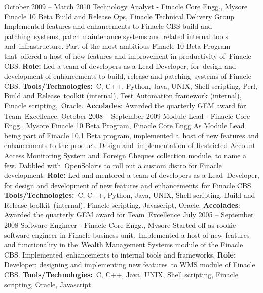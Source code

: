 \documentclass[11pt,a4paper,sans]{moderncv}
\begin{document}
\cventry
{October 2009 -- March 2010}
{Technology Analyst - Finacle Core Engg., Mysore}
{Finacle 10 Beta Build and Release Ops, Finacle Technical Delivery Group}
{}
{}
{Implemented features and enhancements to Finacle CBS build and patching\
systems, patch maintenance systems and related internal tools and\
infrastructure. Part of the most ambitious Finacle 10 Beta Program that\
offered a host of new features and improvement in productivity of\
Finacle CBS. 
\newline{}
\newline{}
\small {\textbf{Role:} Led a team of developers as a Lead Developer, for\
	design and development of enhancements to build, release and patching\
	systems of Finacle CBS.}
\newline{}
\small {\textbf{Tools/Technologies:}\
C, C++, Python, Java, UNIX, Shell scripting, Perl, Build and Release\
toolkit (internal), Test Automation framework (internal), Finacle scripting,\
Oracle.} 
\newline{}
\small {\textbf{Accolades}: Awarded the quarterly GEM award for Team\
Excellence.}
\newline{}
}
\cventry
{October 2008 -- September 2009}
{Module Lead - Finacle Core Engg., Mysore}
{Finacle 10 Beta Program, Finacle Core Engg}
{}
{}
{As Module Lead being part of Finacle 10.1 Beta program, implemented a\
host of new features and enhancements to the product. Design and\
implementation of Restricted Account Access Monitoring System and\
Foreign Cheques collection module, to name a few. Dabbled with\
OpenSolaris to roll out a custom distro for Finacle development.
\newline{}
\newline{}
\small {\textbf{Role:} Led and mentored a team of developers as a Lead\
	Developer, for design and development of new features and enhancements\
  for Finacle CBS.}
\newline{}
\small {\textbf{Tools/Technologies:}\
C, C++, Python, Java, UNIX, Shell scripting, Build and Release toolkit\
(internal), Finacle scripting, Javascript, Oracle.} 
\newline{}
\small {\textbf{Accolades}: Awarded the quarterly GEM award for Team\
Excellence}
\newline{}
}
\cventry
{July 2005 -- September 2008}
{Software Engineer - Finacle Core Engg., Mysore}
{}
{}
{}
{Started off as rookie software engineer in Finacle business unit.\
Implemented a host of new features and functionality in the\
Wealth Management Systems module of the Finacle CBS. Implemented\
enhancements to internal tools and frameworks.
\newline{} 
\newline{}
\small {\textbf{Role:} Developer; designing and implementing new features\
to WMS module of Finacle CBS.}
\newline{}
\small {\textbf{Tools/Technologies:}\
C, C++, Java, UNIX, Shell scripting, Finacle scripting, Oracle, Javascript.} 
\newline{}
}
\end{document}
